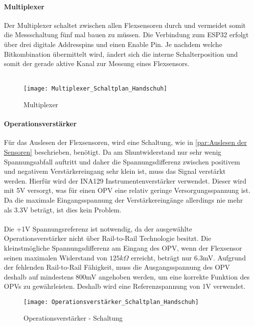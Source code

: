 \documentclass[titlepage,12pt,twoside]{article}
\begin{document}
\paragraph{Multiplexer}
\hfill \break
\hfill \break
Der Multiplexer schaltet zwischen allen Flexsensoren durch und vermeidet somit die Messschaltung fünf mal bauen zu müssen. 
Die Verbindung zum ESP32 erfolgt über drei digitale Addresspins und einen Enable Pin. Je nachdem welche Bitkombination übermittelt
wird, ändert sich die interne Schalterposition und somit der gerade aktive Kanal zur Messung eines Flexsensors. \\
\\
\begin{figure}[H]
	\begin{center}
		\scalebox{0.5}
		{\texttt{[image: Multiplexer\_Schaltplan\_Handschuh]}}
		\caption{Multiplexer}
		\label{fig:Multiplexer_Schaltplan_Handschuh}		
	\end{center}
\end{figure}

\paragraph{Operationsverstärker}
\hfill \break
\hfill \break
Für das Auslesen der Flexsensoren, wird eine Schaltung, wie in \autoref{par:Auslesen der Sensoren} beschrieben, benötigt. Da am
Shuntwiderstand nur sehr wenig Spannungsabfall auftritt und daher die Spannungsdifferenz zwischen positivem und negativem 
Verstärkereingang sehr klein ist, muss das Signal verstärkt werden. Hierfür wird der INA129 Instrumentenverstärker verwendet.
Dieser wird mit 5V versorgt, was für einen OPV eine relativ geringe Versorgungsspannung ist. Da die maximale Eingangsspannung
der Verstärkereingänge allerdings nie mehr als 3.3V beträgt, ist dies kein Problem. \\
\\
Die +1V Spannungsreferenz ist notwendig, da der ausgewählte Operationsverstärker nicht über Rail-to-Rail Technologie besitzt. 
Die kleinstmögliche Spannungsdifferenz am Eingang des OPV, wenn der Flexsensor seinen maximalen Widerstand von
$125k\Omega$ erreicht, beträgt nur 6.3mV. Aufgrund der fehlenden Rail-to-Rail Fähigkeit, muss die Ausgangsspannung des OPV deshalb
auf mindestens 800mV angehoben werden, um eine korrekte Funktion des OPVs zu gewährleisten. Deshalb wird eine Referenzspannung
von 1V verwendet. \\
\begin{figure}[H]
	\begin{center}
		\scalebox{0.5}
		{\texttt{[image: Operationsverstärker\_Schaltplan\_Handschuh]}}
		\caption{Operationsverstärker - Schaltung}
		\label{fig:Operationsverstärker_Schaltplan_Handschuh}		
	\end{center}
\end{figure}
\end{document}
